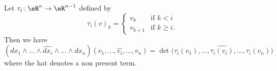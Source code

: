 \begin{lemma}    \label{LEMooICRXooFKPCRd}
    Let \( \tau_i\colon \eR^n\to \eR^{n-1}\) defined by
    \begin{equation}
        \tau_i(v)_k=\begin{cases}
            v_k    &   \text{if } k<i\\
            v_{k+1}    &    \text{if } k\geq i\text{.}
        \end{cases}
    \end{equation}
    Then we have
    \begin{equation}
        (dx_1\wedge\ldots\wedge\widehat{dx_i}\wedge\ldots\wedge dx_n)(v_1,\ldots, \widehat{v_i},\ldots, v_n)=
        \det\Big(  \tau_i(v_1),\ldots, \widehat{\tau_i(v_i)},\ldots, \tau_i(v_n)  \Big)
    \end{equation}
    where the hat denotes a non present term.
\end{lemma}

